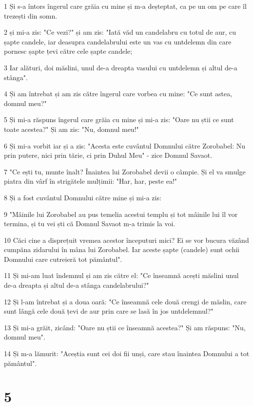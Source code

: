\par 1 Și s-a întors îngerul care grăia cu mine și m-a deșteptat, ca pe un om pe care îl trezești din somn.
\par 2 și mi-a zis: "Ce vezi?" și am zis: "Iată văd un candelabru cu totul de aur, cu șapte candele, iar deasupra candelabrului este un vas cu untdelemn din care pornesc șapte țevi către cele șapte candele;
\par 3 Iar alături, doi măslini, unul de-a dreapta vasului cu untdelemn și altul de-a stânga".
\par 4 Și am întrebat și am zis către îngerul care vorbea cu mine: "Ce sunt astea, domnul meu?"
\par 5 Și mi-a răspuns îngerul care grăia cu mine și mi-a zis: "Oare nu știi ce sunt toate acestea?" Și am zis: "Nu, domnul meu!"
\par 6 Și mi-a vorbit iar și a zis: "Acesta este cuvântul Domnului către Zorobabel: Nu prin putere, nici prin tărie, ci prin Duhul Meu" - zice Domnul Savaot.
\par 7 "Ce ești tu, munte înalt? Înaintea lui Zorobabel devii o câmpie. Și el va smulge piatra din vârf în strigătele mulțimii: "Har, har, peste ea!"
\par 8 Și a fost cuvântul Domnului către mine și mi-a zis:
\par 9 "Mâinile lui Zorobabel au pus temelia acestui templu și tot mâinile lui îl vor termina, și tu vei ști că Domnul Savaot m-a trimis la voi.
\par 10 Căci cine a disprețuit vremea acestor începuturi mici? Ei se vor bucura văzând cumpăna zidarului în mâna lui Zorobabel. Iar aceste șapte (candele) sunt ochii Domnului care cutreieră tot pământul".
\par 11 Și mi-am luat îndemnul și am zis către el: "Ce înseamnă acești măslini unul de-a dreapta și altul de-a stânga candelabrului?"
\par 12 Și l-am întrebat și a doua oară: "Ce înseamnă cele două crengi de măslin, care sunt lângă cele două țevi de aur prin care se lasă în jos untdelemnul?"
\par 13 Și mi-a grăit, zicând: "Oare nu știi ce înseamnă acestea?" Și am răspuns: "Nu, domnul meu".
\par 14 Și m-a lămurit: "Aceștia sunt cei doi fii unși, care stau înaintea Domnului a tot pământul".

\chapter{5}

